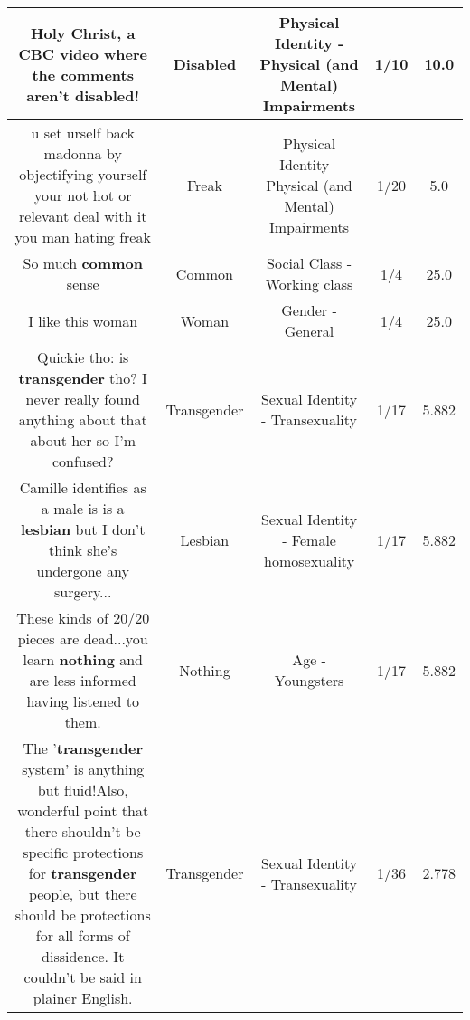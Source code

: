 \documentclass[11pt]{article}
\newlength\mylength
\begin{document}
\begin{center}
\begin{longtable}{|C{.65\mylength}|C{.30\mylength}|C{.12\mylength}|C{.12\mylength}|C{.12\mylength}|}
  \small Holy Christ, a CBC video where the comments aren't \textbf{disabled}!\normalsize   & Disabled & Physical Identity - Physical (and Mental) Impairments & 1/10 & 10.0 \\  \hline
  \small u set urself back madonna by objectifying yourself your not hot or relevant deal with it you man hating freak\normalsize   & Freak & Physical Identity - Physical (and Mental) Impairments & 1/20 & 5.0 \\  \hline
  \small So much \textbf{common} sense\normalsize   & Common & Social Class - Working class & 1/4 & 25.0 \\  \hline
  \small I like this woman\normalsize   & Woman & Gender - General & 1/4 & 25.0 \\  \hline
  \small Quickie tho: is \textbf{transgender} tho? I never really found anything about that about her so I'm confused?\normalsize   & Transgender & Sexual Identity - Transexuality & 1/17 & 5.882 \\  \hline
  \small Camille identifies as a male is is a \textbf{lesbian} but I don't think she's undergone any surgery...\normalsize   & Lesbian & Sexual Identity - Female homosexuality & 1/17 & 5.882 \\  \hline
  \small These kinds of 20/20 pieces are dead...you learn \textbf{nothing} and are less informed having listened to them.\normalsize   & Nothing & Age - Youngsters & 1/17 & 5.882 \\  \hline
  \small The '\textbf{transgender} system' is anything but fluid!Also, wonderful point that there shouldn't be specific protections for \textbf{transgender} people, but there should be protections for all forms of dissidence. It couldn't be said in plainer English.\normalsize   & Transgender & Sexual Identity - Transexuality & 1/36 & 2.778 \\  \hline

\end{longtable}
\end{center}
\end{document}
